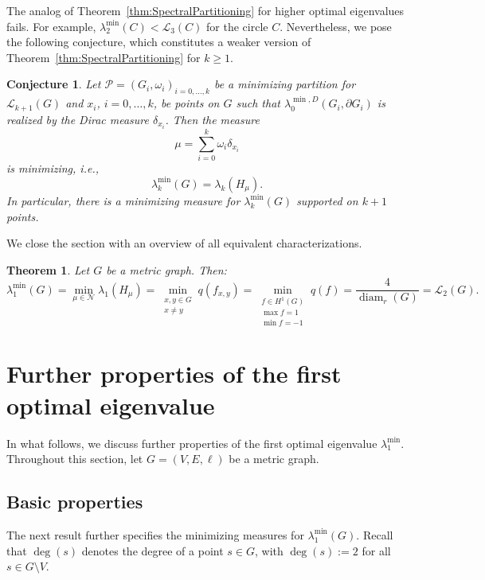 \documentclass[reqno]{amsart}
\theoremstyle{plain}
\newtheorem{thm}{Theorem}[section]
\newtheorem{conjecture}{Conjecture}
\theoremstyle{definition}
\theoremstyle{remark}
\numberwithin{equation}{section}
\newcommand{\cN}{\mathcal{N}}
\newcommand{\cP}{\mathcal{P}}   %
\newcommand{\diam}{\operatorname{diam}}
\begin{document}
The analog of Theorem~\ref{thm:SpectralPartitioning} for higher optimal eigenvalues fails. For example, $\lambda_{2}^{\min}(C) < \mathcal{L}_{3}(C)$ for the circle $C$. Nevertheless, we pose the following conjecture, which constitutes a weaker version of Theorem~\ref{thm:SpectralPartitioning} for $k \ge 1$.


\begin{conjecture}
Let $\cP = (G_i, \omega_i)_{i=0, \dots, k}$ be a minimizing partition for $\mathcal{L}_{k+1}(G)$ and $x_i$, $i=0, \dots, k$, be points on $G$ such that $\lambda_0^{\min, D}(G_i, \partial G_i)$ is realized by the Dirac measure $\delta_{x_i}$. Then the measure 
\[
\mu = \sum_{i=0}^{k} \omega_i \delta_{x_i}
\]
is minimizing, i.e.,
\[
\lambda_{k}^{\min}(G) = \lambda_{k}(H_\mu). 
\]
In particular, there is a minimizing measure for $\lambda_{k}^{\min}(G)$ supported on $k+1$ points. 
\end{conjecture}

We close the section with an overview of all equivalent characterizations. 
\begin{thm}
Let $G$ be a metric graph. Then:	
	\[
	\lambda_{1}^{\min}(G) = \min\limits_{\mu \in \cN} \lambda_{1}(H_\mu) = \min\limits_{\substack{x,y \in G \\ x\neq y}} q(f_{x,y})  = \min\limits_{\substack{f \in H^1(G) \\ \max f =1\\ \min f= -1}} q(f) = \dfrac{4}{\diam_r(G)}  = \mathcal{L}_{2}(G). 
	\]
\end{thm}





\section{Further properties of the first optimal eigenvalue} \label{sec:PropertiesFirstEigenvalue}
In what follows, we discuss further properties of the first optimal eigenvalue $\lambda_1^{\min}$. Throughout this section, let $G = (V,E, \ell)$ be a metric graph.

\subsection{Basic properties}
The next result further specifies the minimizing measures for $\lambda_1^{\min}(G)$. Recall that $\deg(s)$ denotes the degree of a point $s \in G$, with $\deg(s) := 2$ for all $s \in G \setminus V$.
\end{document}
